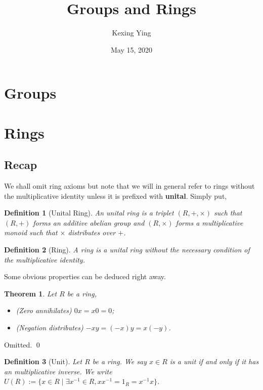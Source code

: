\documentclass[
]{article}
\title{Groups and Rings}
\author{Kexing Ying}
\date{May 15, 2020}
\newtheorem{theorem}{Theorem}
\newtheorem{definition}{Definition}[theorem]
\begin{document}
\maketitle

{
\hypersetup{linkcolor=}
\setcounter{tocdepth}{2}
\tableofcontents
}
\hypertarget{groups}{%
\section{Groups}\label{groups}}

\hypertarget{rings}{%
\section{Rings}\label{rings}}

\hypertarget{recap}{%
\subsection{Recap}\label{recap}}

We shall omit ring axioms but note that we will in general refer to
rings without the multiplicative identity unless it is prefixed with
\textbf{unital}. Simply put,

\begin{definition}[Unital Ring]
  An \textit{unital ring} is a triplet \((R, +, \times)\) such that \((R, +)\) 
  forms an additive abelian group and \((R, \times)\) forms a multiplicative 
  monoid such that \(\times\) distributes over \(+\).
\end{definition}
\begin{definition}[Ring]
  A \textit{ring} is a unital ring without the necessary condition of the 
  multiplicative identity. 
\end{definition}

Some obvious properties can be deduced right away.

\begin{theorem}
  Let \(R\) be a ring, 
  \begin{itemize}
    \item (Zero annihilates) \(0 x = x 0 = 0\);
    \item (Negation distributes) \(-xy = (-x)y = x(-y)\).
  \end{itemize}
\end{theorem}
\proof

Omitted. \qed

\begin{definition}[Unit]
  Let \(R\) be a ring. We say \(x \in R\) is a unit if and only if it has an 
  multiplicative inverse. We write 
  \(U(R) := \{x \in R \mid \exists x^{-1} \in R, x x^{-1} = 1_R = x^{-1} x\}\).
\end{definition}
\end{document}
